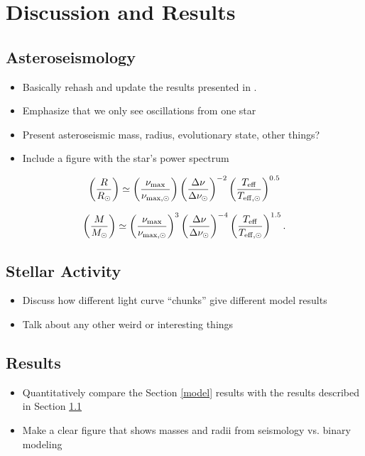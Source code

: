 \section{Discussion and Results}\label{discuss}

\subsection{Asteroseismology}\label{seismo}
\begin{itemize}
\item Basically rehash and update the results presented in \citet{gau14}.
\item Emphasize that we only see oscillations from one star
\item Present asteroseismic mass, radius, evolutionary state, other things?
\item Include a figure with the star's power spectrum
\end{itemize}

\begin{equation}
\left( \frac{R}{R_\odot} \right) \simeq \left( \frac{\nu_{\rm{max}}}{\nu_{\rm{max,\odot}}} \right) \left( \frac{\Delta \nu}{\Delta \nu_\odot} \right)^{-2} \left( \frac{T_{\rm{eff}}}{T_{\rm{eff,\odot}}} \right)^{0.5}
\end{equation}

\begin{equation}
\left( \frac{M}{M_\odot} \right) \simeq \left( \frac{\nu_{\rm{max}}}{\nu_{\rm{max,\odot}}} \right)^3 \left( \frac{\Delta \nu}{\Delta \nu_\odot} \right)^{-4} \left( \frac{T_{\rm{eff}}}{T_{\rm{eff,\odot}}} \right)^{1.5}.
\end{equation}

\subsection{Stellar Activity}
\begin{itemize}
\item Discuss how different light curve ``chunks'' give different model results
\item Talk about any other weird or interesting things
\end{itemize}

\subsection{Results}\label{results}
\begin{itemize}
\item Quantitatively compare the Section \ref{model} results with the \citet{gau14} results described in Section \ref{seismo}
\item Make a clear figure that shows masses and radii from seismology vs. binary modeling
\end{itemize}
